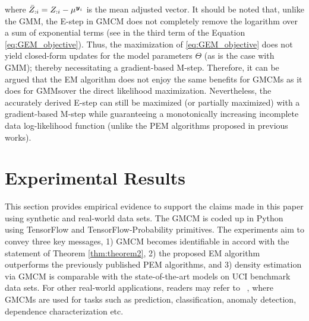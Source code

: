 \documentclass{article}
\theoremstyle{plain}
\theoremstyle{definition}
\theoremstyle{remark}
\begin{document}
where $\bar{Z}_{:{i}}=Z_{:i}-\mu^{\boldsymbol{y}_i}$ is the mean adjusted vector. It should be noted that, unlike the GMM, the E-step in GMCM does not completely remove the logarithm over a sum of exponential terms (see in the third term of the Equation \ref{eq:GEM_objective}). Thus, the maximization of \eqref{eq:GEM_objective} does not yield closed-form updates for the model parameters $\Theta$ (as is the case with GMM); thereby necessitating a gradient-based M-step. Therefore, it can be argued that the EM algorithm does not enjoy the same benefits for GMCMs \textemdash as it does for GMMs\textemdash over the direct likelihood maximization. Nevertheless, the accurately derived E-step can still be maximized (or partially maximized) with a gradient-based M-step while guaranteeing a monotonically increasing incomplete data log-likelihood function (unlike the PEM algorithms proposed in previous works).

\section{Experimental Results}\label{sec:Experimental}
This section provides empirical evidence to support the claims made in this paper using synthetic and real-world data sets. The GMCM is coded up in Python using TensorFlow and TensorFlow-Probability primitives.  The experiments aim to convey three key messages, 1) GMCM becomes identifiable in accord with the statement of Theorem \ref{thm:theorem2}, 2) the proposed EM algorithm outperforms the previously published  PEM algorithms, and 3) density estimation via GMCM is comparable with the state-of-the-art models on UCI benchmark data sets. For other real-world applications, readers may refer to ~\cite{Bilgrau2012quantification,Wang2014,Yu2013GMCMWindPred,Bayestehtashk2015}, where GMCMs are used for tasks such as prediction, classification, anomaly detection, dependence characterization etc.
\end{document}
